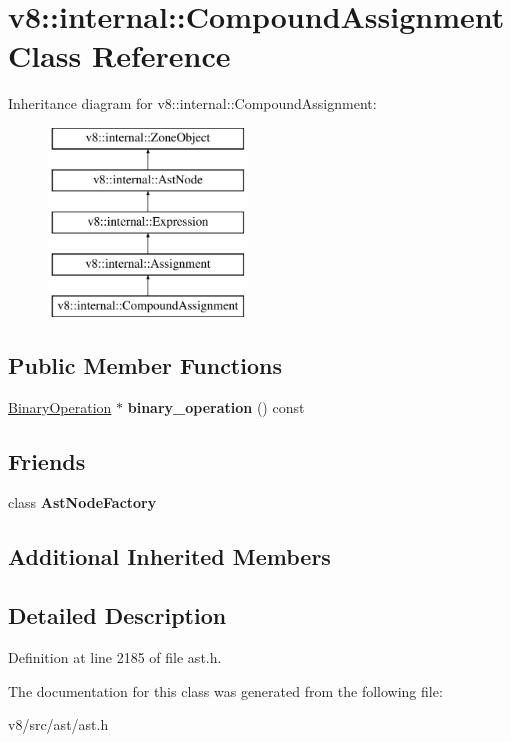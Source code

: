 \hypertarget{classv8_1_1internal_1_1CompoundAssignment}{}\section{v8\+:\+:internal\+:\+:Compound\+Assignment Class Reference}
\label{classv8_1_1internal_1_1CompoundAssignment}
Inheritance diagram for v8\+:\+:internal\+:\+:Compound\+Assignment\+:\begin{figure}[H]
\begin{center}
\leavevmode
\includegraphics[height=5.000000cm]{classv8_1_1internal_1_1CompoundAssignment}
\end{center}
\end{figure}
\subsection*{Public Member Functions}
\begin{DoxyCompactItemize}
\item 
\mbox{\label{classv8_1_1internal_1_1CompoundAssignment_a44cb94ad9e9c66c868d95750d0ec00ca}} 
\mbox{\hyperlink{classv8_1_1internal_1_1BinaryOperation}{Binary\+Operation}} $\ast$ {\bfseries binary\+\_\+operation} () const
\end{DoxyCompactItemize}
\subsection*{Friends}
\begin{DoxyCompactItemize}
\item 
\mbox{\label{classv8_1_1internal_1_1CompoundAssignment_a8d587c8ad3515ff6433eb83c578e795f}} 
class {\bfseries Ast\+Node\+Factory}
\end{DoxyCompactItemize}
\subsection*{Additional Inherited Members}


\subsection{Detailed Description}


Definition at line 2185 of file ast.\+h.



The documentation for this class was generated from the following file\+:\begin{DoxyCompactItemize}
\item 
v8/src/ast/ast.\+h\end{DoxyCompactItemize}
